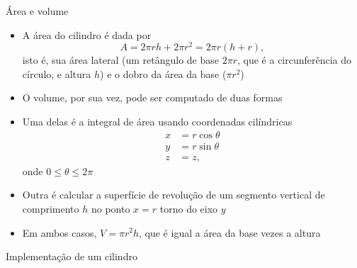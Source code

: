 \begin{frame}[fragile]{Área e volume}

    \begin{itemize}
        \item A área do cilindro é dada por 
        \[
            A = 2\pi rh + 2\pi r^2 = 2\pi r(h + r),
        \]
        isto é, sua área lateral (um retângulo de base $2\pi r$, que é a circunferência
            do círculo, e altura $h$) e o dobro da área da base ($\pi r^2$)
        \pause

        \item O volume, por sua vez, pode ser computado de duas formas
        \pause

        \item Uma delas é a integral de área usando coordenadas cilíndricas 
        \begin{align*}
            x &= r\cos \theta\\
            y &= r\sin \theta\\
            z &= z,
        \end{align*}
        onde $0 \leq \theta \leq 2\pi$
        \pause

        \item Outra é calcular a superfície de revolução de um segmento vertical de comprimento
            $h$ no ponto $x = r$ torno do eixo $y$
        \pause

        \item Em ambos casos, $V = \pi r^2 h$, que é igual a área da base vezes a altura

    \end{itemize}

\end{frame}

\begin{frame}[fragile]{Implementação de um cilindro}
\end{frame}
